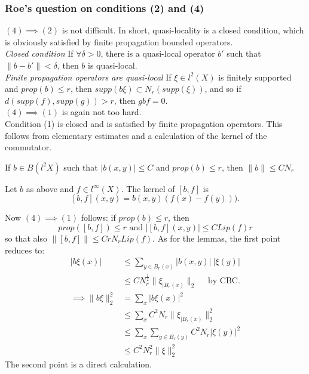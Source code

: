 \subsubsection{Roe's question on conditions (2) and (4)}
$(4)\implies (2)$ is not difficult. In short, quasi-locality is a closed condition, which is obviously satisfied by finite propagation bounded operators. \\

\textit{Closed condition} If $\forall \delta> 0 $, there is a quasi-local operator $b'$ such that $\| b - b' \| < \delta $, then $b$ is quasi-local.\\

\textit{Finite propagation operators are quasi-local} If $\xi \in l^2(X)$ is finitely supported and $prop(b)\leq r$, then $supp( b\xi ) \subset N_r( supp(\xi))$, and so if $d(supp(f), supp(g))> r$, then $gbf = 0$.\\

$(4)\implies (1)$ is again not too hard. \\
Condition (1) is closed and is satisfied by finite propagation operators. This follows from elementary estimates and a calculation of the kernel of the commutator.
\begin{lem}
If $b\in B(l^2X)$ such that $|b(x,y)|\leq C$ and $prop(b)\leq r$, then $\| b \| \leq C N_r$
\end{lem}

\begin{lem} Let $b$ as above and $f\in l^\infty(X) $. The kernel of $[b,f]$ is 
\[[b,f](x,y) = b(x,y) (f(x)-f(y))).\]
\end{lem}

Now $(4)\implies (1)$ follows: if $prop(b)\leq r$, then \[prop([b,f]) \leq r \text{ and } | [b,f](x,y)| \leq C Lip(f)r\] so that also $\| [b,f] \| \leq C r N_r Lip(f)$. As for the lemmas, the first point reduces to:
\[\begin{split}
 |b\xi (x)|  & \leq \sum_{y\in B_r(x)} |b(x,y)|\ |\xi(y)| \\
	& \leq C N_r^\frac{1}{2} \| \xi_{|B_r(x)} \|_2 \quad\text{ by CBC}.\\
\implies \| b\xi \|_2^2 & = \sum_x |b\xi (x)|^2 \\
			& \leq \sum_x C^2 N_r \| \xi_{|B_r(x)} \|_2^2 \\
			& \leq \sum_x \sum_{y\in B_r(y)} C^2 N_r | \xi(y)|^2 \\
			& \leq C^2N_r^2 \|\xi \|^2_2 
\end{split}\]
The second point is a direct calculation.

